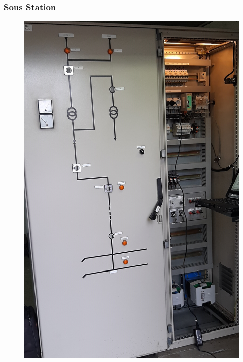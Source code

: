 \documentclass{article}
\begin{document}
        \subsubsection{Sous Station}
            \label{SousStation}
            \begin{figure}[!h]
                \centering
                \includegraphics[scale = 0.1]{Images/sousStation1.jpg}

\end{figure}
\end{document}
